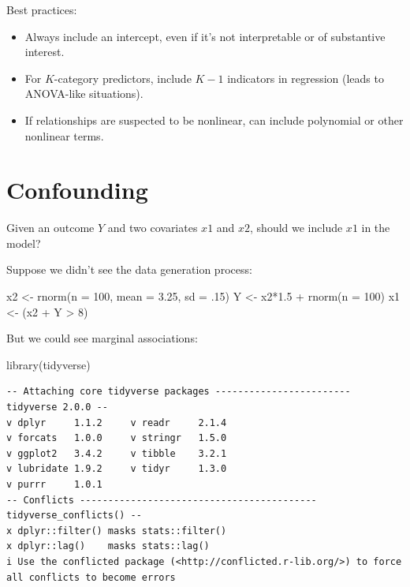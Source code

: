\documentclass[
  letterpaper,
  DIV=11,
  numbers=noendperiod]{scrreport}
\newenvironment{Shaded}{\begin{snugshade}}{\end{snugshade}}
\newcommand{\AttributeTok}[1]{\textcolor[rgb]{0.40,0.45,0.13}{#1}}
\newcommand{\DecValTok}[1]{\textcolor[rgb]{0.68,0.00,0.00}{#1}}
\newcommand{\FloatTok}[1]{\textcolor[rgb]{0.68,0.00,0.00}{#1}}
\newcommand{\FunctionTok}[1]{\textcolor[rgb]{0.28,0.35,0.67}{#1}}
\newcommand{\NormalTok}[1]{\textcolor[rgb]{0.00,0.23,0.31}{#1}}
\newcommand{\OtherTok}[1]{\textcolor[rgb]{0.00,0.23,0.31}{#1}}
\newcommand{\SpecialCharTok}[1]{\textcolor[rgb]{0.37,0.37,0.37}{#1}}
\providecommand{\tightlist}{%
  \setlength{\itemsep}{0pt}\setlength{\parskip}{0pt}}\usepackage{longtable,booktabs,array}
\begin{document}
Best practices:

\begin{itemize}
\tightlist
\item
  Always include an intercept, even if it's not interpretable or of
  substantive interest.
\item
  For \(K\)-category predictors, include \(K-1\) indicators in
  regression (leads to ANOVA-like situations).
\item
  If relationships are suspected to be nonlinear, can include polynomial
  or other nonlinear terms.
\end{itemize}

\hypertarget{confounding}{%
\section{Confounding}\label{confounding}}

Given an outcome \(Y\) and two covariates \(x1\) and \(x2\), should we
include \(x1\) in the model?

Suppose we didn't see the data generation process:

\begin{Shaded}
\begin{Highlighting}[]
\NormalTok{x2 }\OtherTok{\textless{}{-}} \FunctionTok{rnorm}\NormalTok{(}\AttributeTok{n =} \DecValTok{100}\NormalTok{, }\AttributeTok{mean =} \FloatTok{3.25}\NormalTok{, }\AttributeTok{sd =}\NormalTok{ .}\DecValTok{15}\NormalTok{)}
\NormalTok{Y }\OtherTok{\textless{}{-}}\NormalTok{ x2}\SpecialCharTok{*}\FloatTok{1.5} \SpecialCharTok{+} \FunctionTok{rnorm}\NormalTok{(}\AttributeTok{n =} \DecValTok{100}\NormalTok{)}
\NormalTok{x1 }\OtherTok{\textless{}{-}}\NormalTok{ (x2 }\SpecialCharTok{+}\NormalTok{ Y }\SpecialCharTok{\textgreater{}} \DecValTok{8}\NormalTok{)}
\end{Highlighting}
\end{Shaded}

But we could see marginal associations:

\begin{Shaded}
\begin{Highlighting}[]
\FunctionTok{library}\NormalTok{(tidyverse)}
\end{Highlighting}
\end{Shaded}

\begin{verbatim}
-- Attaching core tidyverse packages ------------------------ tidyverse 2.0.0 --
v dplyr     1.1.2     v readr     2.1.4
v forcats   1.0.0     v stringr   1.5.0
v ggplot2   3.4.2     v tibble    3.2.1
v lubridate 1.9.2     v tidyr     1.3.0
v purrr     1.0.1     
-- Conflicts ------------------------------------------ tidyverse_conflicts() --
x dplyr::filter() masks stats::filter()
x dplyr::lag()    masks stats::lag()
i Use the conflicted package (<http://conflicted.r-lib.org/>) to force all conflicts to become errors
\end{verbatim}
\end{document}
